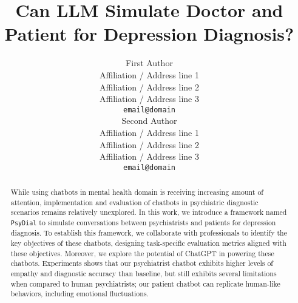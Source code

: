 \documentclass[11pt]{article}
\title{Can LLM Simulate Doctor and Patient for Depression Diagnosis?}
\author{First Author \\
  Affiliation / Address line 1 \\
  Affiliation / Address line 2 \\
  Affiliation / Address line 3 \\
  \texttt{email@domain} \\\And
  Second Author \\
  Affiliation / Address line 1 \\
  Affiliation / Address line 2 \\
  Affiliation / Address line 3 \\
  \texttt{email@domain} \\}
\begin{document}
\maketitle

\begin{abstract}
While using chatbots in mental health domain is receiving increasing amount of attention, implementation and evaluation of chatbots in psychiatric diagnostic scenarios remains relatively unexplored.
In this work, we introduce a framework named \texttt{PsyDial} to simulate conversations between psychiatrists and patients for depression diagnosis. To establish this framework, we collaborate with professionals to identify the key objectives of these chatbots, designing task-specific evaluation metrics aligned with these objectives. Moreover, we explore the potential of ChatGPT in powering these chatbots. 
Experiments shows that our psychiatrist chatbot exhibits higher levels of empathy and diagnostic accuracy than baseline, but still exhibits several limitations when compared to human psychiatrists; our patient chatbot can replicate human-like behaviors, including emotional fluctuations.


\end{abstract}











\appendix

\end{document}
